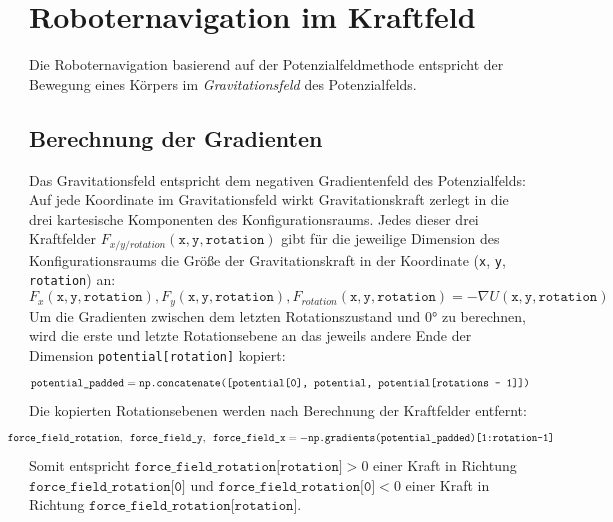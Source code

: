 \chapter{Roboternavigation im Kraftfeld}

Die Roboternavigation basierend auf der Potenzialfeldmethode entspricht der Bewegung eines Körpers im \textit{Gravitationsfeld} des Potenzialfelds.

\section{Berechnung der Gradienten}

Das Gravitationsfeld entspricht dem negativen Gradientenfeld des Potenzialfelds: Auf jede Koordinate im Gravitationsfeld wirkt Gravitationskraft zerlegt in die drei kartesische Komponenten des Konfigurationsraums. Jedes dieser drei Kraftfelder $F_{x/y/rotation}(\texttt{x}, \texttt{y}, \texttt{rotation})$ gibt für die jeweilige Dimension des Konfigurationsraums die Größe der Gravitationskraft in der Koordinate (\texttt{x}, \texttt{y}, \texttt{rotation}) an:
\begin{equation*}
 F_{x}(\texttt{x}, \texttt{y}, \texttt{rotation}), F_{y}(\texttt{x}, \texttt{y}, \texttt{rotation}), F_{rotation}(\texttt{x}, \texttt{y}, \texttt{rotation}) = -\nabla U(\texttt{x}, \texttt{y}, \texttt{rotation})
\end{equation*}
Um die Gradienten zwischen dem letzten Rotationszustand und $0$° zu berechnen, wird die erste und letzte Rotationsebene an das jeweils andere Ende der Dimension \texttt{potential[rotation]} kopiert:
\begin{equation*}
\hspace*{-0.0075\linewidth}
\resizebox{1.05\linewidth}{!}{
$
	\texttt{potential\_padded} = \texttt{np.concatenate([potential[0], potential, potential[\texttt{rotations - 1}]])}
$
}
\hspace*{-0.0075\linewidth}
\end{equation*}
Die kopierten Rotationsebenen werden nach Berechnung der Kraftfelder entfernt:
\begin{equation*}
\hspace*{-0.075\linewidth}
\resizebox{1.15\linewidth}{!}{
$
\texttt{force\_field\_rotation}, \texttt{ force\_field\_y}, \texttt{ force\_field\_x} = -\texttt{np.gradients(potential\_padded)[1:rotation-1]}
$
}
\hspace*{-0.075\linewidth}
\end{equation*}
Somit entspricht $ \texttt{force\_field\_rotation[rotation]} > 0 $ einer Kraft in Richtung $\texttt{force\_field\_rotation[0]}$ und $ \texttt{force\_field\_rotation[0]} < 0 $ einer Kraft in Richtung $\texttt{force\_field\_rotation[rotation]}$.
